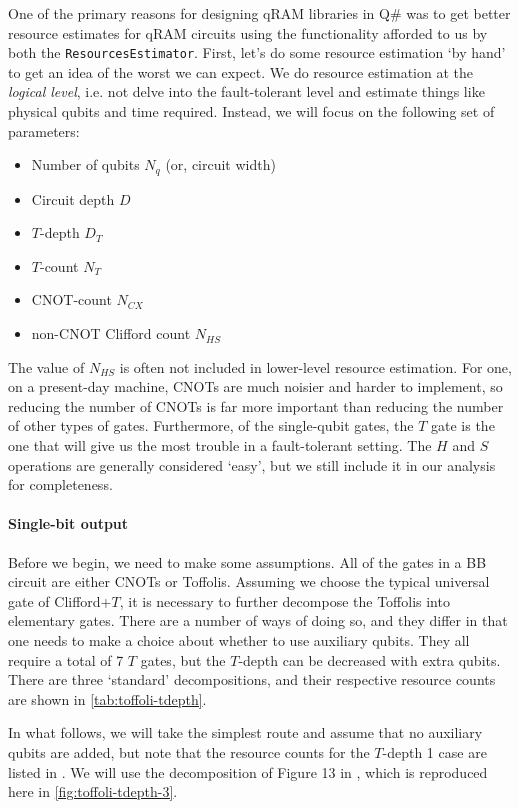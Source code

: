 \documentclass[a4paper,12pt]{article}
\begin{document}
One of the primary reasons for designing qRAM libraries in Q\# was to get better resource estimates for qRAM circuits using the functionality afforded to us by both the \texttt{ResourcesEstimator}.
First, let's do some resource estimation `by hand' to get an idea of the worst we can expect.
We do resource estimation at the \emph{logical level}, i.e. not delve into the fault-tolerant level and estimate things like physical qubits and time required. 
Instead, we will focus on the following set of parameters:
\begin{itemize}
 \item Number of qubits $N_q$ (or, circuit width)
 \item Circuit depth $D$
 \item $T$-depth $D_T$
 \item $T$-count $N_T$
 \item CNOT-count $N_{CX}$
 \item non-CNOT Clifford count $N_{HS}$
\end{itemize}
The value of $N_{HS}$ is often not included in lower-level resource estimation. 
For one, on a present-day machine, CNOTs are much noisier and harder to implement, so reducing the number of CNOTs is far more important than reducing the number of other types of gates. 
Furthermore, of the single-qubit gates, the $T$ gate is the one that will give us the most trouble in a fault-tolerant setting. 
The $H$ and $S$ operations are generally considered `easy', but we still include it in our analysis for completeness.

\paragraph{Single-bit output}

Before we begin, we need to make some assumptions. 
All of the gates in a BB circuit are either CNOTs or Toffolis. 
Assuming we choose the typical universal gate of Clifford+$T$, it is necessary to further decompose the Toffolis into elementary gates.
There are a number of ways of doing so, and they differ in that one needs to make a choice about whether to use auxiliary qubits. 
They all require a total of 7 $T$ gates, but the $T$-depth can be decreased with extra qubits. 
There are three `standard' decompositions, and their respective resource counts are shown in \autoref{tab:toffoli-tdepth}. 

In what follows, we will take the simplest route and assume that no auxiliary qubits are added, but note that the resource counts for the $T$-depth 1 case are listed in \cite{DiMatteo2020}. 
We will use the decomposition of Figure 13 in \cite{MITM}, which is reproduced here in \autoref{fig:toffoli-tdepth-3}.
\end{document}
